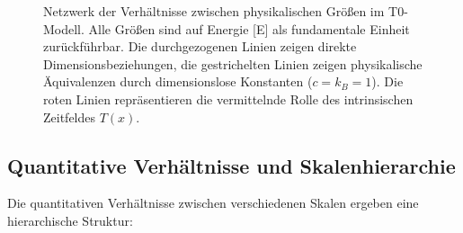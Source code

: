 \documentclass[12pt,a4paper]{article}
\newcommand{\Tfield}{T(x)}
\begin{document}
\begin{figure}[ht]
		\caption{Netzwerk der Verhältnisse zwischen physikalischen Größen im T0-Modell. Alle Größen sind auf Energie [E] als fundamentale Einheit zurückführbar. Die durchgezogenen Linien zeigen direkte Dimensionsbeziehungen, die gestrichelten Linien zeigen physikalische Äquivalenzen durch dimensionslose Konstanten ($c = k_B = 1$). Die roten Linien repräsentieren die vermittelnde Rolle des intrinsischen Zeitfeldes $\Tfield$.}
		\label{fig:quantity_network}
	\end{figure}
	
	\subsection{Quantitative Verhältnisse und Skalenhierarchie}
	
	Die quantitativen Verhältnisse zwischen verschiedenen Skalen ergeben eine hierarchische Struktur:
	
\end{document}
